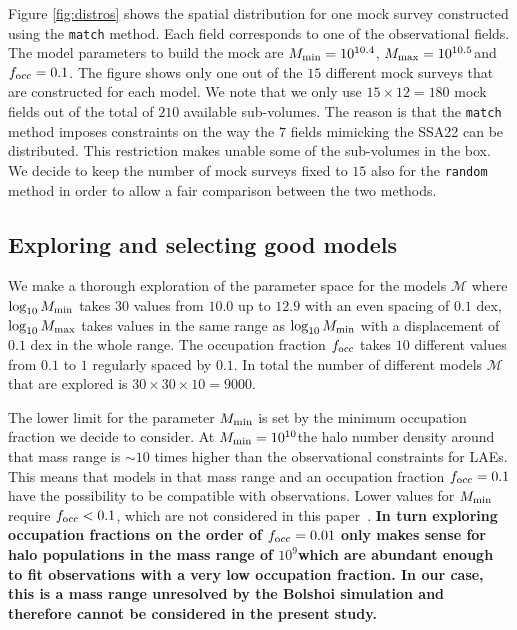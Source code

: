 \documentclass[usenatbib]{mn2e}
\newcommand{\documentname}{paper~}
\newcommand{\hMsun}{{\ifmmode{h^{-1}{\rm
        {M_{\odot}}}}\else{$h^{-1}{\rm{M_{\odot}}}$}\fi}}
\begin{document}
Figure \ref{fig:distros} shows the spatial distribution for one mock
survey constructed using the {\texttt{match}} method. Each field
corresponds to one of the observational fields. The model parameters
to build the mock are $M_{\rm min}=10^{10.4}$\hMsun, $M_{\rm
  max}=10^{10.5}$\hMsun and $f_{\rm occ}=0.1$. The figure shows only
one out of the $15$ different mock surveys that are constructed for
each model. We note that we only use $15\times 12=180$ mock fields out of the
total of $210$ available sub-volumes. The reason is that the {\texttt{match}}
method imposes constraints on the way the $7$ fields mimicking the
SSA22 can be distributed. This restriction makes unable some of the
sub-volumes in the box. We decide to keep the number of mock surveys
fixed to $15$ also for the {\texttt{random}} method in order to allow a
fair comparison between the two methods.

\subsection{Exploring and selecting good models}

We make a thorough exploration of the parameter space for the models
${\mathcal M}$ where $\log_{10} M_{\rm min}$ takes $30$ values from $10.0$ up
to $12.9$ with an even spacing of $0.1$ dex, $\log_{10} M_{\rm max}$
takes values in the same range as $\log_{10}M_{\rm min}$ with a
displacement of $0.1$ dex in the whole range. The occupation fraction
$f_{\rm occ}$ takes $10$ different values from $0.1$ to $1$ regularly
spaced by $0.1$. In total the number of different models ${\mathcal
  M}$ that are explored is $30 \times 30 \times 10 = 9000$.  

The lower limit for the parameter $M_{\rm min}$ is set by the minimum
occupation fraction we decide to consider. At $M_{\rm
  min}=10^{10}$\hMsun the halo number density around that mass range
is $\sim 10$ times higher than the observational constraints
for LAEs. This means that models in that mass range and an occupation fraction $f_{\rm  occ}=0.1$ have the possibility to be compatible with
observations. Lower values for $M_{\rm min}$ require $f_{\rm
  occ}<0.1$, which are not considered in this \documentname.  {\bf In
  turn exploring occupation fractions on the order of $f_{\rm occ}=0.01$ 
  only makes sense for halo populations in the mass range of
  $10^{9}$\hMsun which are abundant enough to fit observations with a
  very low occupation fraction. In our case, this is a mass range unresolved
  by the Bolshoi simulation and therefore cannot be considered in the
  present study.}
\end{document}

